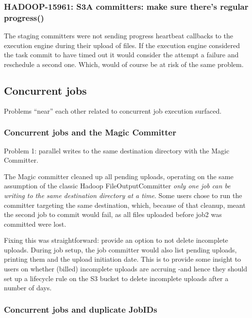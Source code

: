 \documentclass[conference]{IEEEtran}
\begin{document}
\subsubsection{HADOOP-15961: S3A committers: make sure there's regular progress()}
\label{subsec:HADOOP-15961}



The staging committers were not sending progress heartbeat callbacks
to the execution engine during their upload of files.
If the execution engine considered the task commit to have timed out
it would consider the attempt a failure and reschedule a second one.
Which, would of course be at risk of the same problem.



\subsection{Concurrent jobs}
\label{subsec:concurrent-jobs}

Problems ``near'' each other related to concurrent job execution surfaced.

\subsubsection{Concurrent jobs and the Magic Committer}

Problem 1: parallel writes to the same destination directory with the Magic Committer.

The Magic committer cleaned up all pending uploads,
operating on the same assumption of the classic Hadoop FileOutputCommitter
\emph{only one job can be writing to the same destination directory at a time}.
Some users chose to run the committer targeting the same destination, which,
because of that cleanup, meant the second job to commit would fail, as all
files uploaded before job2 was committed were lost.

Fixing this was straightforward: provide an option to not delete incomplete
uploads.
During job setup, the job committer would also list pending
uploads, printing them and the upload initiation date.
This is to provide some insight to users on whether (billed) incomplete uploads
are accruing -and hence they should set up a lifecycle rule on the S3 bucket
to delete incomplete uploads after a number of days.

\subsubsection{Concurrent jobs and duplicate JobIDs}
\end{document}
